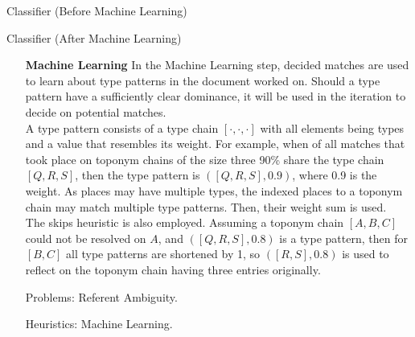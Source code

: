 \documentclass[11pt]{article}
\begin{document}
\newpage
\begin{algorithm}[H]


\caption{Classifier (Before Machine Learning)}
\end{algorithm}
\vspace{0.5cm}
\begin{algorithm}[H]

\caption{Classifier (After Machine Learning)}
\end{algorithm}

\newpage

\begin{itemize}
\item[\textbf{Machine Learning}] In the Machine Learning step, decided matches are used to learn about type patterns in the document worked on. Should a type pattern have a sufficiently clear dominance, it will be used in the iteration to decide on potential matches.\\
A type pattern consists of a type chain $[\cdot,\cdot,\cdot]$ with all elements being types and a value that resembles its weight. For example, when of all matches that took place on toponym chains of the size three 90\% share the type chain $[Q,R,S]$, then the type pattern is $([Q,R,S], 0.9)$, where 0.9 is the weight. As places may have multiple types, the indexed places to a toponym chain may match multiple type patterns. Then, their weight sum is used.\\
The skips heuristic is also employed. Assuming a toponym chain $[A,B,C]$ could not be resolved on $A$, and $([Q,R,S], 0.8)$ is a type pattern, then for $[B,C]$ all type patterns are shortened by 1, so $([R,S], 0.8)$ is used to reflect on the toponym chain having three entries originally.
\item[Problems:] Referent Ambiguity.
\item[Heuristics:] Machine Learning.
\end{itemize}
\end{document}
